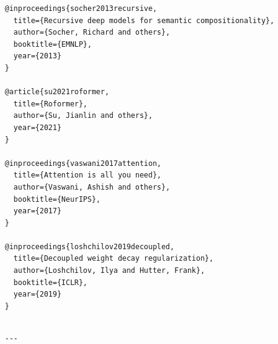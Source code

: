 \begin{lstlisting}
@inproceedings{socher2013recursive,
  title={Recursive deep models for semantic compositionality},
  author={Socher, Richard and others},
  booktitle={EMNLP},
  year={2013}
}

@article{su2021roformer,
  title={Roformer},
  author={Su, Jianlin and others},
  year={2021}
}

@inproceedings{vaswani2017attention,
  title={Attention is all you need},
  author={Vaswani, Ashish and others},
  booktitle={NeurIPS},
  year={2017}
}

@inproceedings{loshchilov2019decoupled,
  title={Decoupled weight decay regularization},
  author={Loshchilov, Ilya and Hutter, Frank},
  booktitle={ICLR},
  year={2019}
}
\end{lstlisting}
\begin{lstlisting}

---
\end{lstlisting}